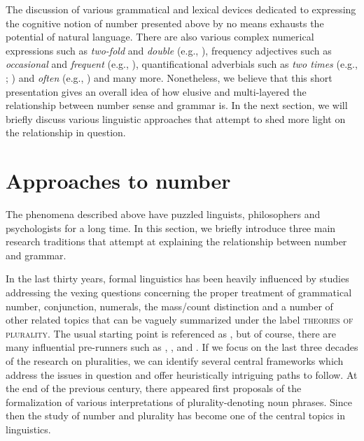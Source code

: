 \documentclass[output=paper]{langscibook}
\begin{document}
\noindent The discussion of various grammatical and lexical devices dedicated to expressing the cognitive notion of number presented above by no means exhausts the potential of natural language. There are also various complex numerical expressions such as \textit{two-fold} and \textit{double} (e.g., \citealt{wagiel2018subatomic}), frequency adjectives such as \textit{occasional} and \textit{frequent} (e.g., \citealt{gehrke_mcnally2015distributional}), quantificational adverbials such as \textit{two times} (e.g., \citealt[Ch.~11]{landman2004indefinites}; \citealt{docekal_wagiel2018event}) and \textit{often} (e.g., \citealt{doetjes2007adverbs}) and many more. Nonetheless, we believe that this short presentation gives an overall idea of how elusive and multi-layered the relationship between number sense and grammar is. In the next section, we will briefly discuss various linguistic approaches that attempt to shed more light on the relationship in question.

\section{Approaches to number}\label{doc-wag:sec:approaches-to-number}

The phenomena described above have puzzled linguists, philosophers and psychologists for a long time. In this section, we briefly introduce three main research traditions that attempt at explaining the relationship between number and grammar. 

In the last thirty years, formal linguistics has been heavily influenced by studies addressing the vexing questions concerning the proper treatment of grammatical number, conjunction, numerals, the mass/count distinction and a number of other related topics that can be vaguely summarized under the label \textsc{theories of plurality}. The usual starting point is referenced as \citet{link1983logical}, but of course, there are many influential pre-runners such as \citet{bennett1979mass}, \citet{ter_meulen1980substances}, and \citet{scha1981distributive}. If we focus on the last three decades of the research on pluralities, we can identify several central frameworks which address the issues in question and offer heuristically intriguing paths to follow. At the end of the previous century, there appeared first proposals of the formalization of various interpretations of plurality-denoting noun phrases. Since then the study of number and plurality has become one of the central topics in linguistics.
\end{document}
